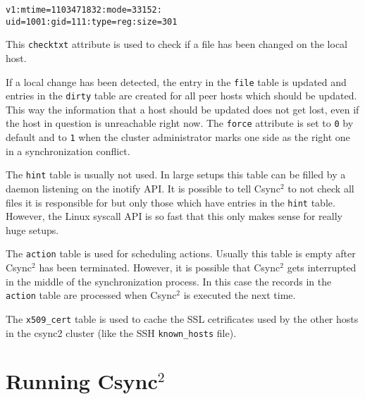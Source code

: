 \documentclass[a4paper,twocolumn]{article}
\def\csync2{{\sc Csync$^{2}$}}
\begin{document}
\begin{verbatim}
v1:mtime=1103471832:mode=33152:
uid=1001:gid=111:type=reg:size=301
\end{verbatim}

This {\tt checktxt} attribute is used to check if a file has been changed on
the local host.

If a local change has been detected, the entry in the {\tt file} table is
updated and entries in the {\tt dirty} table are created for all peer hosts
which should be updated. This way the information that a host should be updated
does not get lost, even if the host in question is unreachable right now. The
{\tt force} attribute is set to {\tt 0} by default and to {\tt 1} when the
cluster administrator marks one side as the right one in a synchronization
conflict.

The {\tt hint} table is usually not used. In large setups this table can be
filled by a daemon listening on the inotify API. It is possible to tell \csync2
to not check all files it is responsible for but only those which have entries
in the {\tt hint} table. However, the Linux syscall API is so fast that this
only makes sense for really huge setups.

The {\tt action} table is used for scheduling actions. Usually this table is
empty after \csync2 has been terminated. However, it is possible that \csync2
gets interrupted in the middle of the synchronization process. In this case
the records in the {\tt action} table are processed when \csync2 is executed
the next time.

The {\tt x509\_cert} table is used to cache the SSL cetrificates used by the
other hosts in the csync2 cluster (like the SSH {\tt known\_hosts} file).

\section{Running \csync2}

\end{document}

